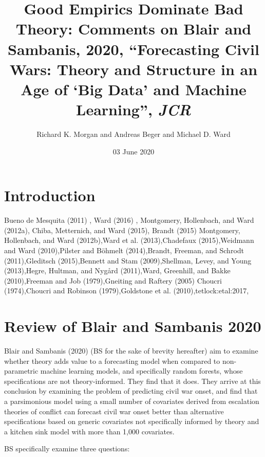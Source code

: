 \documentclass[]{article}
\title{Good Empirics Dominate Bad Theory: Comments on Blair and Sambanis, 2020,
``Forecasting Civil Wars: Theory and Structure in an Age of `Big Data'
and Machine Learning'', \emph{JCR}}
\author{Richard K. Morgan and Andreas Beger and Michael D. Ward}
\date{03 June 2020}
\begin{document}
\maketitle

\hypertarget{introduction}{%
\section{Introduction}\label{introduction}}

Bueno de Mesquita (2011) , Ward (2016) , Montgomery, Hollenbach, and
Ward (2012a), Chiba, Metternich, and Ward (2015), Brandt (2015)
Montgomery, Hollenbach, and Ward (2012b),Ward et al. (2013),Chadefaux
(2015),Weidmann and Ward (2010),Pilster and Böhmelt (2014),Brandt,
Freeman, and Schrodt (2011),Gleditsch (2015),Bennett and Stam
(2009),Shellman, Levey, and Young (2013),Hegre, Hultman, and Nygård
(2011),Ward, Greenhill, and Bakke (2010),Freeman and Job (1979),Gneiting
and Raftery (2005) Choucri (1974),Choucri and Robinson (1979),Goldstone
et al. (2010),tetlock:etal:2017,

\hypertarget{review-of-blair-and-sambanis-2020}{%
\section{Review of Blair and Sambanis
2020}\label{review-of-blair-and-sambanis-2020}}

Blair and Sambanis (2020) (BS for the sake of brevity hereafter) aim to
examine whether theory adds value to a forecasting model when compared
to non-parametric machine learning models, and specifically random
forests, whose specifications are not theory-informed. They find that it
does. They arrive at this conclusion by examining the problem of
predicting civil war onset, and find that a parsimonious model using a
small number of covariates derived from escalation theories of conflict
can forecast civil war onset better than alternative specifications
based on generic covariates not specifically informed by theory and a
kitchen sink model with more than 1,000 covariates.

BS specifically examine three questions:
\end{document}
